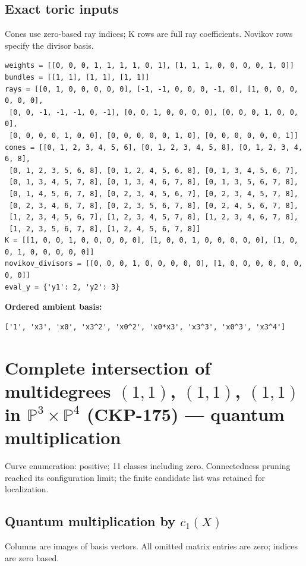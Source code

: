 \documentclass[10pt,a4paper]{article}
\begin{document}
\subsection*{Exact toric inputs}
Cones use zero-based ray indices; K rows are full ray coefficients. Novikov rows specify the divisor basis.

\begin{lstlisting}
weights = [[0, 0, 0, 1, 1, 1, 1, 0, 1], [1, 1, 1, 0, 0, 0, 0, 1, 0]]
bundles = [[1, 1], [1, 1], [1, 1]]
rays = [[0, 1, 0, 0, 0, 0, 0], [-1, -1, 0, 0, 0, -1, 0], [1, 0, 0, 0, 0, 0, 0],
 [0, 0, -1, -1, -1, 0, -1], [0, 0, 1, 0, 0, 0, 0], [0, 0, 0, 1, 0, 0, 0],
 [0, 0, 0, 0, 1, 0, 0], [0, 0, 0, 0, 0, 1, 0], [0, 0, 0, 0, 0, 0, 1]]
cones = [[0, 1, 2, 3, 4, 5, 6], [0, 1, 2, 3, 4, 5, 8], [0, 1, 2, 3, 4, 6, 8],
 [0, 1, 2, 3, 5, 6, 8], [0, 1, 2, 4, 5, 6, 8], [0, 1, 3, 4, 5, 6, 7],
 [0, 1, 3, 4, 5, 7, 8], [0, 1, 3, 4, 6, 7, 8], [0, 1, 3, 5, 6, 7, 8],
 [0, 1, 4, 5, 6, 7, 8], [0, 2, 3, 4, 5, 6, 7], [0, 2, 3, 4, 5, 7, 8],
 [0, 2, 3, 4, 6, 7, 8], [0, 2, 3, 5, 6, 7, 8], [0, 2, 4, 5, 6, 7, 8],
 [1, 2, 3, 4, 5, 6, 7], [1, 2, 3, 4, 5, 7, 8], [1, 2, 3, 4, 6, 7, 8],
 [1, 2, 3, 5, 6, 7, 8], [1, 2, 4, 5, 6, 7, 8]]
K = [[1, 0, 0, 1, 0, 0, 0, 0, 0], [1, 0, 0, 1, 0, 0, 0, 0, 0], [1, 0, 0, 1, 0, 0, 0, 0, 0]]
novikov_divisors = [[0, 0, 0, 1, 0, 0, 0, 0, 0], [1, 0, 0, 0, 0, 0, 0, 0, 0]]
eval_y = {'y1': 2, 'y2': 3}
\end{lstlisting}

\textbf{Ordered ambient basis:}
\begin{lstlisting}
['1', 'x3', 'x0', 'x3^2', 'x0^2', 'x0*x3', 'x3^3', 'x0^3', 'x3^4']
\end{lstlisting}

\clearpage\section*{Complete intersection of multidegrees $(1,1)$, $(1,1)$, $(1,1)$ in $\mathbb P^{3}\times \mathbb P^{4}$ (CKP-175) --- quantum multiplication}

Curve enumeration: positive; 11 classes including zero.
Connectedness pruning reached its configuration limit; the finite candidate list was retained for localization.
\subsection*{Quantum multiplication by $c_1(X)$}
Columns are images of basis vectors. All omitted matrix entries are zero; indices are zero based.
\end{document}
